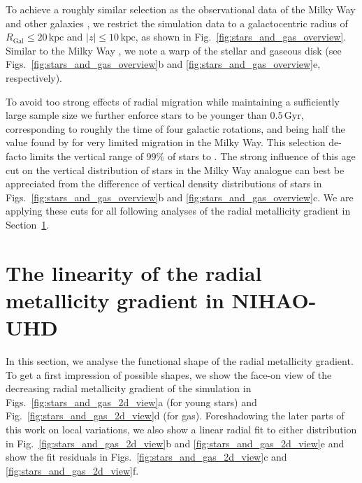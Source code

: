 \documentclass[twocolumn,apj,numberedappendix,appendixfloats,twocolappendix]{openjournal}
\newcommand{\nihaoAGEmax}{$0.5\,\mathrm{Gyr}$}
\begin{document}
\begin{CJK*}{UTF8}{gbsn}
To achieve a roughly similar selection as the observational data of the Milky Way \citep{Genovali2014} and other galaxies \citep[e.g.][]{Chen2023}, we restrict the simulation data to a galactocentric radius of $R_\mathrm{Gal} \leq 20\,\mathrm{kpc}$ and $\vert z \vert \leq 10\,\mathrm{kpc}$, as shown in Fig.~\ref{fig:stars_and_gas_overview}. Similar to the Milky Way \citep{Poggio2018, Lemasle2022}, we note a warp of the stellar and gaseous disk (see Figs.~\ref{fig:stars_and_gas_overview}b and \ref{fig:stars_and_gas_overview}e, respectively).

To avoid too strong effects of radial migration \citep{Binney2008, Frankel2018, Grand2016, Minchev2018} while maintaining a sufficiently large sample size we further enforce stars to be younger than \nihaoAGEmax, corresponding to roughly the time of four galactic rotations, and being half the value found by \citet{Minchev2018} for very limited migration in the Milky Way. This selection de-facto limits the vertical range of 99\% of stars to . The strong influence of this age cut on the vertical distribution of stars in the Milky Way analogue can best be appreciated from the difference of vertical density distributions of stars in Figs.~\ref{fig:stars_and_gas_overview}b and \ref{fig:stars_and_gas_overview}c. We are applying these cuts for all following analyses of the radial metallicity gradient in Section~\ref{sec:linear_radial_metallicity_gradients}.


\section{The linearity of the radial metallicity gradient in NIHAO-UHD}
\label{sec:linear_radial_metallicity_gradients}

In this section, we analyse the functional shape of the radial metallicity gradient. To get a first impression of possible shapes, we show the face-on view of the decreasing radial metallicity gradient of the simulation in Figs.~\ref{fig:stars_and_gas_2d_view}a (for young stars) and Fig.~\ref{fig:stars_and_gas_2d_view}d (for gas). Foreshadowing the later parts of this work on local variations, we also show a linear radial fit to either distribution in Fig.~\ref{fig:stars_and_gas_2d_view}b and \ref{fig:stars_and_gas_2d_view}e and show the fit residuals in Figs.~\ref{fig:stars_and_gas_2d_view}c and \ref{fig:stars_and_gas_2d_view}f.


\end{CJK*}
\end{document}
